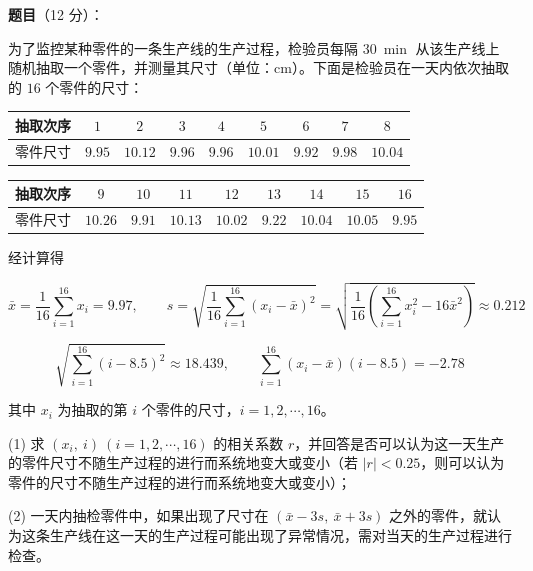 \begin{answer}

\textbf{题目}（12 分）：

为了监控某种零件的一条生产线的生产过程，检验员每隔 $30\ \min$ 从该生产线上随机抽取一个零件，并测量其尺寸（单位：$\mathrm{cm}$）。下面是检验员在一天内依次抽取的 $16$ 个零件的尺寸：

\begin{center}
\begingroup\setlength{\tabcolsep}{4pt}
\begin{tabular}{ccccccccc}
\toprule
抽取次序 & $1$ & $2$ & $3$ & $4$ & $5$ & $6$ & $7$ & $8$ \\
\midrule
零件尺寸 & $9.95$ & $10.12$ & $9.96$ & $9.96$ & $10.01$ & $9.92$ & $9.98$ & $10.04$ \\
\bottomrule
\end{tabular}
\endgroup
\end{center}

\begin{center}
\begingroup\setlength{\tabcolsep}{4pt}
\begin{tabular}{ccccccccc}
\toprule
抽取次序 & $9$ & $10$ & $11$ & $12$ & $13$ & $14$ & $15$ & $16$ \\
\midrule
零件尺寸 & $10.26$ & $9.91$ & $10.13$ & $10.02$ & $9.22$ & $10.04$ & $10.05$ & $9.95$ \\
\bottomrule
\end{tabular}
\endgroup
\end{center}

经计算得

\nopagebreak[4]
\[\bar x=\frac1{16}\sum_{i=1}^{16}x_i=9.97,\qquad s=\sqrt{\frac1{16}\sum_{i=1}^{16}\left(x_i-\bar x\right)^{2}}=\sqrt{\frac1{16}\left(\sum_{i=1}^{16}x_i^{2}-16\bar x^{2}\right)}\approx0.212\]

\nopagebreak[4]
\[\sqrt{\sum_{i=1}^{16}(i-8.5)^{2}}\approx18.439,\qquad \sum_{i=1}^{16}\left(x_i-\bar x\right)(i-8.5)=-2.78\]

其中 $x_i$ 为抽取的第 $i$ 个零件的尺寸，$i=1,2,\cdots,16$。

  (1) 求 $\left(x_i,\ i\right)\ (i=1,2,\cdots,16)$ 的相关系数 $r$，并回答是否可以认为这一天生产的零件尺寸不随生产过程的进行而系统地变大或变小（若 $|r|<0.25$，则可以认为零件的尺寸不随生产过程的进行而系统地变大或变小）；

  (2) 一天内抽检零件中，如果出现了尺寸在 $(\bar x-3s,\ \bar x+3s)$ 之外的零件，就认为这条生产线在这一天的生产过程可能出现了异常情况，需对当天的生产过程进行检查。


\end{answer}
